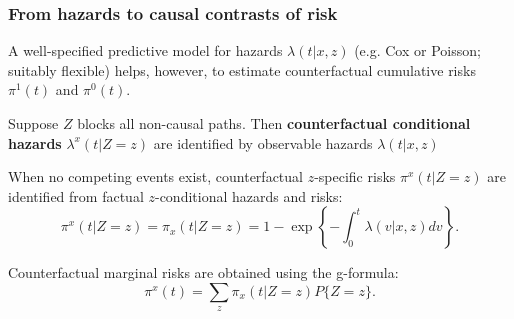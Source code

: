 \documentclass[12pt,dvipsnames,t,aspectratio=169, handout%
]{beamer}
\begin{document}
\begin{frame}
\frametitle{\large From hazards to causal contrasts of risk}
\bi
\item
A well-specified predictive model for hazards $\lambda(t|x,z)$ (e.g.
Cox or Poisson; suitably flexible) helps, however,
to estimate counterfactual cumulative risks $\pi^1(t)$ and $\pi^0(t)$.
\medskip
\item
Suppose $Z$ blocks all non-causal paths. Then
{\bf counterfactual conditional hazards} 
$\lambda^x(t|Z=z)$ are identified by observable hazards $\lambda(t|x,z)$


\medskip
\item When no competing events exist,
counterfactual $z$-specific risks $\pi^x(t|Z=z)$ are identified from
factual $z$-conditional hazards and risks:
$$ \pi^x(t|Z=z) = \pi_x(t|Z=z) = 
    1 - \exp\left\{-\int_0^t \lambda(v|x,z)dv \right\} . $$
\item		
Counterfactual marginal risks are obtained using the {g-formula}: \\
$$ \pi^x(t) = \sum_z \pi_x(t|Z=z) P\{ Z=z \} . $$

\ei


\end{frame}
\end{document}
